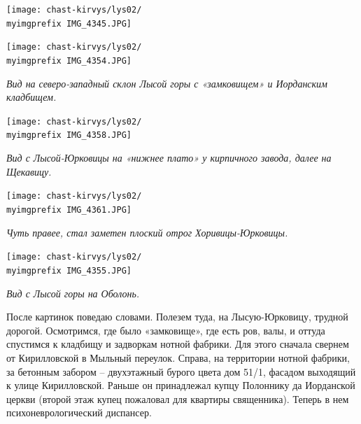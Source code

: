 \newpage





\begin{center}
\texttt{[image: chast-kirvys/lys02/\\myimgprefix IMG\_4345.JPG]}
\end{center}

\begin{center}
\texttt{[image: chast-kirvys/lys02/\\myimgprefix IMG\_4354.JPG]}

\textit{Вид на северо-западный склон Лысой горы с «замковищем» и Иорданским кладбищем.}
\end{center}

\newpage

\begin{center}
\texttt{[image: chast-kirvys/lys02/\\myimgprefix IMG\_4358.JPG]}

\textit{Вид с Лысой-Юрковицы на «нижнее плато» у кирпичного завода, далее на Щекавицу.}
\end{center}


\begin{center}
\texttt{[image: chast-kirvys/lys02/\\myimgprefix IMG\_4361.JPG]}

\textit{Чуть правее, стал заметен плоский отрог Хоривицы-Юрковицы.}
\end{center}

\newpage

\begin{center}
\texttt{[image: chast-kirvys/lys02/\\myimgprefix IMG\_4355.JPG]}

\textit{Вид с Лысой горы на Оболонь.}
\end{center}

После картинок поведаю словами. Полезем туда, на Лысую-Юрковицу, трудной дорогой. Осмотримся, где было «замковище», где есть ров, валы, и оттуда спустимся к кладбищу и задворкам нотной фабрики. Для этого сначала свернем от Кирилловской в Мыльный переулок. Справа, на территории нотной фабрики, за бетонным забором – двухэтажный бурого цвета дом 51/1, фасадом выходящий к улице Кирилловской. Раньше он принадлежал купцу Полоннику да Иорданской церкви (второй этаж купец пожаловал для квартиры священника). Теперь в нем психоневрологический диспансер.

